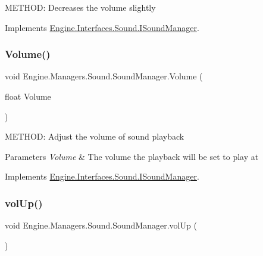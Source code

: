 M\+E\+T\+H\+OD\+: Decreases the volume slightly 



Implements \hyperlink{a00482_a96629b32d608ca84fe1a3624bece7f05}{Engine.\+Interfaces.\+Sound.\+I\+Sound\+Manager}.

\mbox{\label{a00546_ae1be3ecb76007fdc47843305df49604b}} 
\subsubsection{\texorpdfstring{Volume()}{Volume()}}
{\footnotesize\ttfamily void Engine.\+Managers.\+Sound.\+Sound\+Manager.\+Volume (\begin{DoxyParamCaption}\item[{float}]{Volume }\end{DoxyParamCaption})\hspace{0.3cm}{\ttfamily [inline]}}



M\+E\+T\+H\+OD\+: Adjust the volume of sound playback 


\begin{DoxyParams}{Parameters}
{\em Volume} & The volume the playback will be set to play at\\
\hline
\end{DoxyParams}


Implements \hyperlink{a00482_ada3f38d5c50655b55f146ccdaf7c5967}{Engine.\+Interfaces.\+Sound.\+I\+Sound\+Manager}.

\mbox{\label{a00546_af9d82c533dfd90077b275f2b09ee90b0}} 
\subsubsection{\texorpdfstring{vol\+Up()}{volUp()}}
{\footnotesize\ttfamily void Engine.\+Managers.\+Sound.\+Sound\+Manager.\+vol\+Up (\begin{DoxyParamCaption}{ }\end{DoxyParamCaption})\hspace{0.3cm}{\ttfamily [inline]}}



